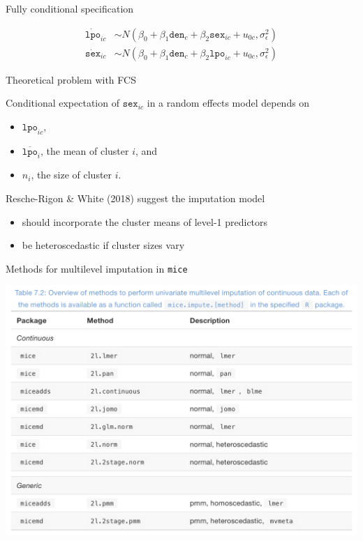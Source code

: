 \documentclass[ignorenonframetext,aspectratio=43]{beamer}
\providecommand{\tightlist}{%
  \setlength{\itemsep}{0pt}\setlength{\parskip}{0pt}}
\begin{document}
\begin{frame}{Fully conditional specification}
\protect\hypertarget{fully-conditional-specification}{}

\begin{align}
\dot{{\texttt{lpo}}}_{ic} & \sim N(\beta_0 + \beta_1 {{\texttt{den}}}_{c} + \beta_2 {{\texttt{sex}}}_{ic} + u_{0c}, \sigma_\epsilon^2)\\
\dot{{\texttt{sex}}}_{ic} & \sim N(\beta_0 + \beta_1 {{\texttt{den}}}_{c} + \beta_2 {{\texttt{lpo}}}_{ic} + u_{0c}, \sigma_\epsilon^2)
\end{align}

\end{frame}

\begin{frame}{Theoretical problem with FCS}
\protect\hypertarget{theoretical-problem-with-fcs}{}

Conditional expectation of \(\texttt{sex}_{ic}\) in a random effects
model depends on

\begin{itemize}
\tightlist
\item
  \(\texttt{lpo}_{ic}\),
\item
  \(\overline{\texttt{lpo}}_{i}\), the mean of cluster \(i\), and
\item
  \(n_i\), the size of cluster \(i\).
\end{itemize}

Resche-Rigon \& White (2018) suggest the imputation model

\begin{itemize}
\tightlist
\item
  should incorporate the cluster means of level-1 predictors
\item
  be heteroscedastic if cluster sizes vary
\end{itemize}

\end{frame}

\begin{frame}{Methods for multilevel imputation in \texttt{mice}}
\protect\hypertarget{methods-for-multilevel-imputation-in-mice}{}

\includegraphics{figures/fig1.png}

\end{frame}
\end{document}
